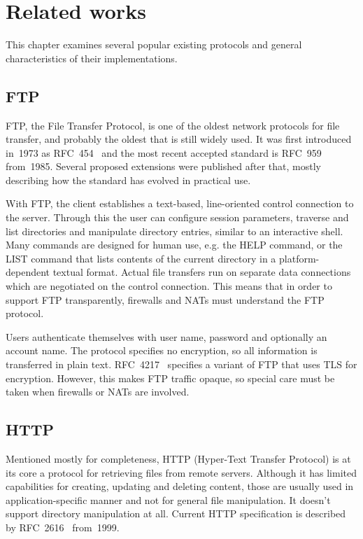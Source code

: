 \chapter{Related works}

This chapter examines several popular existing protocols and general characteristics
of their implementations.

\section{FTP}

FTP, the File Transfer Protocol, is one of the oldest network protocols for file transfer, and probably the
oldest that is still widely used. It was first introduced in~1973 as RFC~454~\cite{rfc454} and the most recent
accepted standard is RFC~959~\cite{rfc959} from~1985. Several proposed extensions were published after that,
mostly describing how the standard has evolved in practical use.

With FTP, the client establishes a text-based, line-oriented control connection to the server. Through this
the user can configure session parameters, traverse and list directories and manipulate directory entries,
similar to an interactive shell. Many commands are designed for human use, e.g. the HELP command, or the LIST
command that lists contents of the current directory in a platform-dependent textual format. Actual file
transfers run on separate data connections which are negotiated on the control connection. This means that in
order to support FTP transparently, firewalls and NATs must understand the FTP protocol.

Users authenticate themselves with user name, password and optionally an account name. The protocol specifies
no encryption, so all information is transferred in plain text. RFC~4217~\cite{rfc4217} specifies a variant of
FTP that uses TLS for encryption. However, this makes FTP traffic opaque, so special care must be taken when
firewalls or NATs are involved.

\section{HTTP}

Mentioned mostly for completeness, HTTP (Hyper-Text Transfer Protocol) is at its core a protocol for
retrieving files from remote servers. Although it has limited capabilities for creating, updating and deleting
content, those are usually used in application-specific manner and not for general file manipulation. It
doesn't support directory manipulation at all. Current HTTP specification is described by
RFC~2616~\cite{rfc2616} from~1999.

